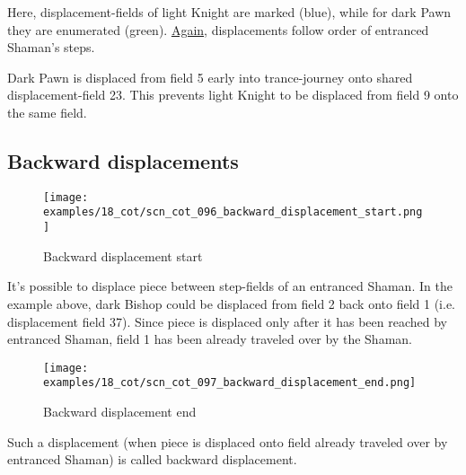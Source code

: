 Here, displacement-fields of light Knight are marked (blue), while for dark Pawn
they are enumerated (green).
\hyperref[fig:scn_cot_087_light_light_shaman_interaction_end]{Again}, displacements
follow order of entranced Shaman's steps.

Dark Pawn is displaced from field 5 early into trance-journey onto shared
displacement-field 23. This prevents light Knight to be displaced from field 9
onto the same field.

\clearpage %

\subsection*{Backward displacements}
\label{sec:Conquest of Tlalocan/Trance-journey/Backward displacements}

\noindent
\begin{figure}[!h]
\vspace{-1.0\baselineskip}
\texttt{[image: examples/18\_cot/scn\_cot\_096\_backward\_displacement\_start.png]}
\caption{Backward displacement start}
\label{fig:scn_cot_096_backward_displacement_start}
\end{figure}

It's possible to displace piece between step-fields of an entranced Shaman. In the
example above, dark Bishop could be displaced from field 2 back onto field 1 (i.e.
displacement field 37). Since piece is displaced only after it has been reached by
entranced Shaman, field 1 has been already traveled over by the Shaman.

\clearpage %

\noindent
\begin{figure}[!h]
\texttt{[image: examples/18\_cot/scn\_cot\_097\_backward\_displacement\_end.png]}
\caption{Backward displacement end}
\label{fig:scn_cot_097_backward_displacement_end}
\end{figure}

Such a displacement (when piece is displaced onto field already traveled over
by entranced Shaman) is called backward displacement.


